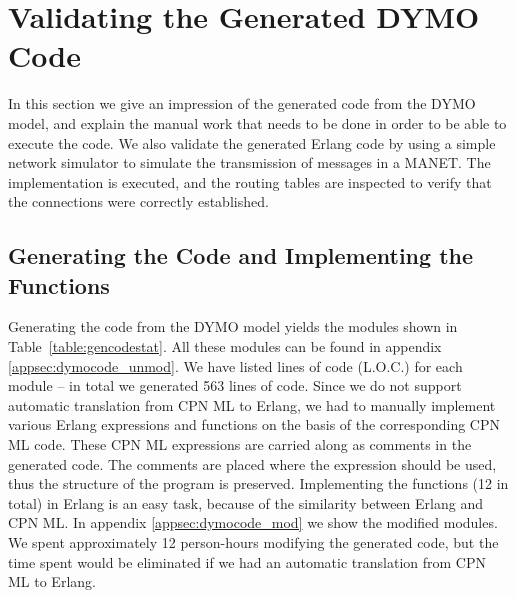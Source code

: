 \section{Validating the Generated DYMO Code}
\label{sec:dymoexperiments}
In this section we give an impression of the generated code from the DYMO model, and explain the manual work that needs to be done in order to be able to execute the code. We also validate the generated Erlang code by using a simple network simulator to simulate the transmission of messages in a MANET. The implementation is executed, and the routing tables are inspected to verify that the connections were correctly established.

\subsection{Generating the Code and Implementing the Functions}

Generating the code from the DYMO model yields the modules shown in Table~\ref{table:gencodestat}. All these modules can be found in appendix \ref{appsec:dymocode_unmod}. We have listed lines of code (L.O.C.) for each module -- in total we generated 563 lines of code. Since we do not support automatic translation from CPN ML to Erlang, we had to manually implement various Erlang expressions and functions on the basis of the corresponding CPN ML code. These CPN ML expressions are carried along as comments in the generated code. The comments are placed where the expression should be used, thus the structure of the program is preserved. Implementing the functions (12 in total) in Erlang is an easy task, because of the similarity between Erlang and CPN ML. In appendix \ref{appsec:dymocode_mod} we show the modified modules. We spent approximately 12 person-hours modifying the generated code, but the time spent would be eliminated if we had an automatic translation from CPN ML to Erlang. 

